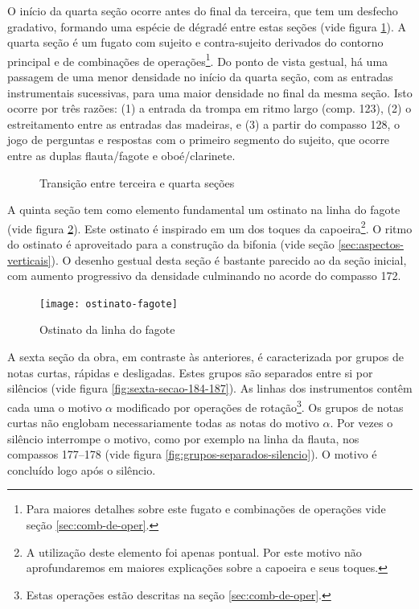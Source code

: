 O início da quarta seção ocorre antes do final da terceira, que tem um
desfecho gradativo, formando uma espécie de dégradé entre estas seções
(vide figura \ref{fig:transicao-3-4}). A quarta seção é um fugato com
sujeito e contra-sujeito derivados do contorno principal e de
combinações de operações\footnote{Para maiores detalhes sobre este
  fugato e combinações de operações vide seção
  \ref{sec:comb-de-oper}.}. Do ponto de vista gestual, há uma passagem
de uma menor densidade no início da quarta seção, com as entradas
instrumentais sucessivas, para uma maior densidade no final da mesma
seção. Isto ocorre por três razões: (1) a entrada da trompa em ritmo
largo (comp. 123), (2) o estreitamento entre as entradas das madeiras,
e (3) a partir do compasso 128, o jogo de perguntas e respostas com o
primeiro segmento do sujeito, que ocorre entre as duplas flauta/fagote
e oboé/clarinete.

\begin{figure}
  \centering
  \caption{Transição entre terceira e quarta seções}
  \label{fig:transicao-3-4}
\end{figure}

A quinta seção tem como elemento fundamental um ostinato na linha do
fagote (vide figura \ref{fig:ostinato-fagote}). Este ostinato é
inspirado em um dos toques da capoeira\footnote{A utilização deste
  elemento foi apenas pontual. Por este motivo não aprofundaremos em
  maiores explicações sobre a capoeira e seus toques.}. O ritmo do
ostinato é aproveitado para a construção da bifonia (vide seção
\ref{sec:aspectos-verticais}). O desenho gestual desta seção é
bastante parecido ao da seção inicial, com aumento progressivo da
densidade culminando no acorde do compasso 172.

\begin{figure}
  \centering
  \texttt{[image: ostinato-fagote]}
  \caption{Ostinato da linha do fagote}
  \label{fig:ostinato-fagote}
\end{figure}

A sexta seção da obra, em contraste às anteriores, é caracterizada por
grupos de notas curtas, rápidas e desligadas. Estes grupos são
separados entre si por silêncios (vide figura
\ref{fig:sexta-secao-184-187}). As linhas dos instrumentos contêm cada
uma o motivo $\alpha$ modificado por operações de
rotação\footnote{Estas operações estão descritas na seção
  \ref{sec:comb-de-oper}.}. Os grupos de notas curtas não englobam
necessariamente todas as notas do motivo $\alpha$. Por vezes o
silêncio interrompe o motivo, como por exemplo na linha da flauta, nos
compassos 177--178 (vide figura
\ref{fig:grupos-separados-silencio}). O motivo é concluído logo após o
silêncio.

